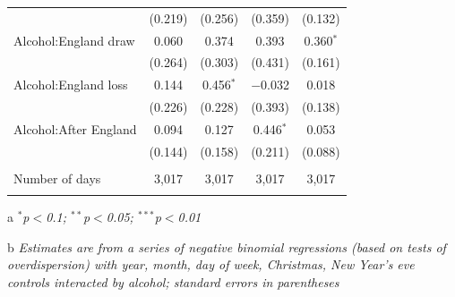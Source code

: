 \documentclass[12pt, letterpaper]{article}
\begin{document}
\begin{table}[!htbp]
{\begin{threeparttable}
\begin{tabular}{@{\extracolsep{5pt}}lcccc}
  & (0.219) & (0.256) & (0.359) & (0.132) \\ 
  Alcohol:England draw & 0.060 & 0.374 & 0.393 & 0.360$^{*}$ \\ 
  & (0.264) & (0.303) & (0.431) & (0.161) \\ 
  Alcohol:England loss & 0.144 & 0.456$^{*}$ & $-$0.032 & 0.018 \\ 
  & (0.226) & (0.228) & (0.393) & (0.138) \\ 
  Alcohol:After England & 0.094 & 0.127 & 0.446$^{*}$ & 0.053 \\ 
  & (0.144) & (0.158) & (0.211) & (0.088) \\ 
 \hline \\[-1.8ex] 
Number of days & 3,017 & 3,017 & 3,017 & 3,017 \\ 
\hline 
\hline \\[-1.8ex] 
\end{tabular} 
\begin{tablenotes}
      \item[a] \textit{$^{*}$p$<$0.1; $^{**}$p$<$0.05; $^{***}$p$<$0.01}
      \item[b] \textit{Estimates are from a series of negative binomial regressions (based on tests of overdispersion)  with year, month, day of week, Christmas, New Year's eve controls interacted by alcohol; standard errors in parentheses}
    \end{tablenotes}
\end{threeparttable} }
\end{table}
\end{document}
